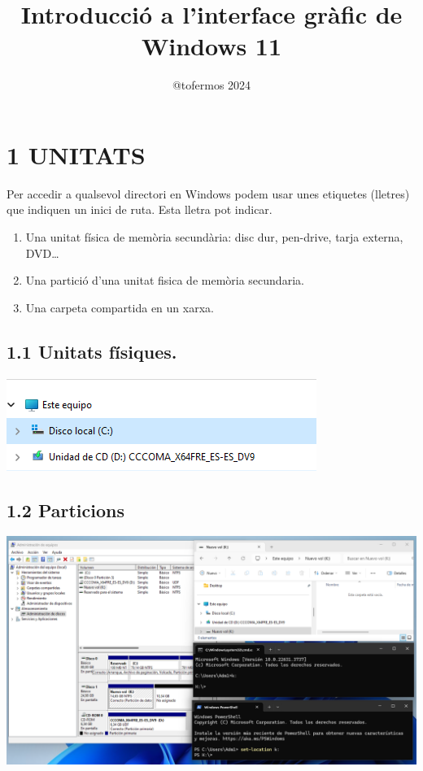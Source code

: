 \documentclass[
  a4paper,
]{article}
\title{Introducció a l'interface gràfic de Windows 11}
\author{@tofermos 2024}
\date{}
\providecommand{\tightlist}{%
  \setlength{\itemsep}{0pt}\setlength{\parskip}{0pt}}
\begin{document}
\maketitle

{
\setcounter{tocdepth}{2}
\tableofcontents
}
\newpage

\renewcommand\tablename{Tabla}

\section{1 UNITATS}\label{unitats}

Per accedir a qualsevol directori en Windows podem usar unes etiquetes
(lletres) que indiquen un inici de ruta. Esta lletra pot indicar.

\begin{enumerate}
\def\labelenumi{\arabic{enumi}.}
\tightlist
\item
  Una unitat física de memòria secundària: disc dur, pen-drive, tarja
  externa, DVD\ldots{}
\item
  Una partició d'una unitat fisica de memòria secundaria.
\item
  Una carpeta compartida en un xarxa.
\end{enumerate}

\subsection{1.1 Unitats físiques.}\label{unitats-fuxedsiques.}

\includegraphics{png/unitatsDiscos.png}

\subsection{1.2 Particions}\label{particions}

\includegraphics{png/unitatFormatejada.png}
\end{document}
